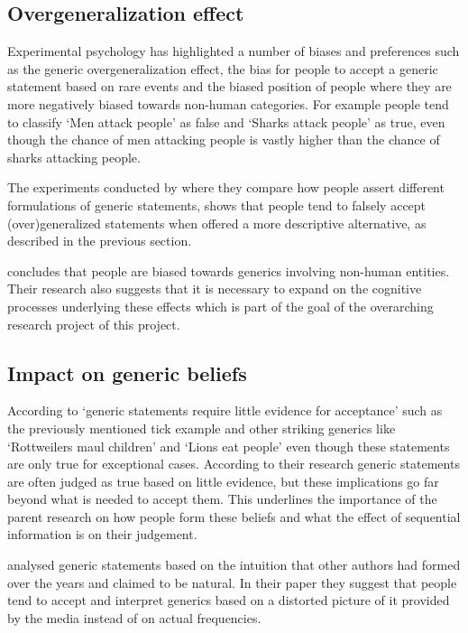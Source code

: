 \documentclass[twoside]{uva-inf-bachelor-thesis}
\begin{document}
\subsection{Overgeneralization effect}
Experimental psychology has highlighted a number of biases and preferences such as the generic overgeneralization effect, the bias for people to accept a generic statement based on rare events and the biased position of people where they are more negatively biased towards non-human categories. For example people tend to classify `Men attack people' as false and `Sharks attack people' as true, even though the chance of men attacking people is vastly higher than the chance of sharks attacking people. 

The experiments conducted by \cite{leslie2011all} where they compare how people assert different formulations of generic statements, shows that people tend to falsely accept (over)generalized statements when offered a more descriptive alternative, as described in the previous section. 

\cite{tasimi2017differences} concludes that people are biased towards generics involving non-human entities. Their research also suggests that it is necessary to expand on the cognitive processes underlying these effects which is part of the goal of the overarching research project of this project.


\subsection{Impact on generic beliefs}
According to \cite{cimpian2010generic} `generic statements require little evidence for acceptance' such as the previously mentioned tick example and other striking generics like `Rottweilers maul children' and `Lions eat people' even though these statements are only true for exceptional cases. According to their research generic statements are often judged as true based on little evidence, but these implications go far beyond what is needed to accept them. This underlines the importance of the parent research on how people form these beliefs and what the effect of sequential information is on their judgement. 

\cite{van2020generics} analysed generic statements based on the intuition that other authors had formed over the years and claimed to be natural. In their paper they suggest that people tend to accept and interpret generics based on a distorted picture of it provided by the media instead of on actual frequencies.
\end{document}

